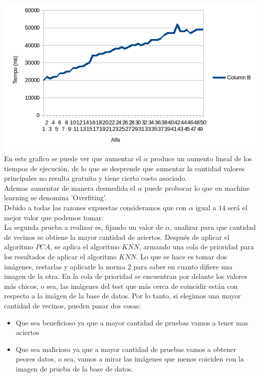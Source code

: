 \includegraphics[scale=0.75]{nuevosResultados/pca/pca1.png}\\

En este grafico se puede ver que aumentar el $\alpha$ produce un aumento lineal de los tiempos de ejecución, de lo que se desprende que aumentar la cantidad valores principales no resulta gratuito y tiene cierto costo asociado.
\\
Ademas aumentar de manera desmedida el $\alpha$ puede probocar lo que en machine learning se denomina 'Overfiting'.
\inventarReferencia
\\
Debido a todas las razones expuestas consideramos que con $\alpha$ igual a $14$ será el mejor valor que podemos tomar.
\\


La segunda prueba a realizar es, fijando un valor de $\alpha$, analizar para que cantidad de vecinos se obtiene la mayor cantidad de aciertos.
Después de aplicar el algoritmo $PCA$, se aplica el algoritmo $KNN$, armando una cola de prioridad para los resultados de aplicar el algoritmo $KNN$. Lo que se hace es tomar dos imágenes, restarlas y aplicarle la norma 2 para saber en cuanto difiere una imagen de la otra. En la cola de prioridad se encuentran por delante los valores más chicos, o sea, las imágenes del test que más cerca de coincidir están con respecto a la imágen de la base de datos.
Por lo tanto, si elegimos una mayor cantidad de vecinos, pueden pasar dos cosas:

\begin{itemize}
  \item Que sea beneficioso ya que a mayor cantidad de pruebas vamos a tener mas aciertos
  \item Que sea malicioso ya que a mayor cantidad de pruebas vamos a obtener peores datos, o sea, vamos a mirar las imágenes que menos coiciden con la imagen de prueba de la base de datos.
\end{itemize}

